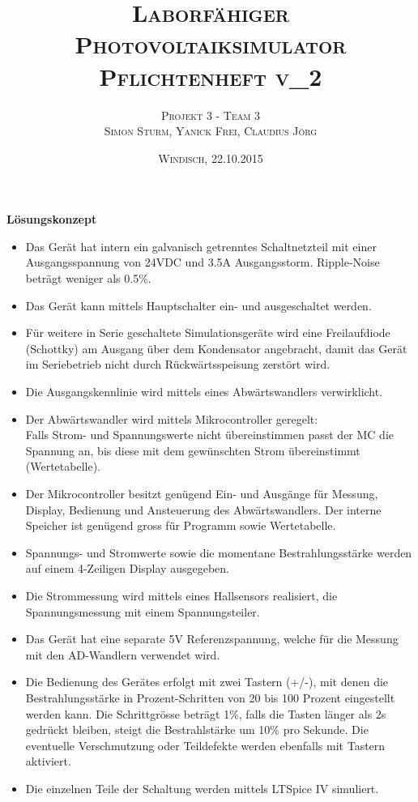 \documentclass [12pt]{fhnwreport}
\title{%
  \textsc{Laborfähiger Photovoltaiksimulator}\\
  \textsc{Pflichtenheft v\_2}}
\author{%
  \textsc{Projekt 3 - Team 3}\\
  \textsc{Simon Sturm, Yanick Frei,
Claudius Jörg}}
\date{\textsc{Windisch, 22.10.2015}}
\begin{document}
\maketitle


\textbf{Lösungskonzept}
\begin{itemize}
	\item Das Gerät hat intern ein galvanisch getrenntes Schaltnetzteil mit einer Ausgangsspannung von 24VDC und 3.5A Ausgangsstorm. Ripple-Noise beträgt weniger als 0.5\%.
	\item Das Gerät kann mittels Hauptschalter ein- und ausgeschaltet werden.
	\item Für weitere in Serie geschaltete Simulationsgeräte wird eine Freilaufdiode (Schottky) am Ausgang über dem Kondensator angebracht, damit das Gerät im Seriebetrieb nicht durch Rückwärtsspeisung zerstört wird.
	\item Die Ausgangskennlinie wird mittels eines Abwärtswandlers verwirklicht.
	\item Der Abwärtswandler wird mittels Mikrocontroller geregelt:\\
	Falls Strom- und Spannungswerte nicht übereinstimmen passt der	MC die Spannung an, bis diese mit dem gewünschten Strom übereinstimmt (Wertetabelle).
	\item Der Mikrocontroller besitzt genügend Ein- und Ausgänge für Messung, Display, Bedienung und Ansteuerung des Abwärtswandlers. Der interne Speicher ist genügend gross für Programm sowie Wertetabelle.
  \item Spannungs- und Stromwerte sowie die momentane Bestrahlungsstärke werden auf einem 4-Zeiligen Display ausgegeben.
	\item Die Strommessung wird mittels eines Hallsensors realisiert, die Spannungsmessung mit einem Spannungsteiler.
	\item Das Gerät hat eine separate 5V Referenzspannung, welche für die Messung mit den AD-Wandlern verwendet wird.
	\item Die Bedienung des Gerätes erfolgt mit zwei Tastern (+/-), mit denen die Bestrahlungsstärke in Prozent-Schritten von 20 bis 100 Prozent eingestellt werden kann. Die Schrittgrösse beträgt 1\%, falls die Tasten länger als 2s gedrückt bleiben, steigt die Bestrahlstärke um 10\% pro Sekunde. Die eventuelle Verschmutzung oder Teildefekte werden ebenfalls mit Tastern aktiviert.
	\item Die einzelnen Teile der Schaltung werden mittels LTSpice IV simuliert.
\end{itemize}
\end{document}
